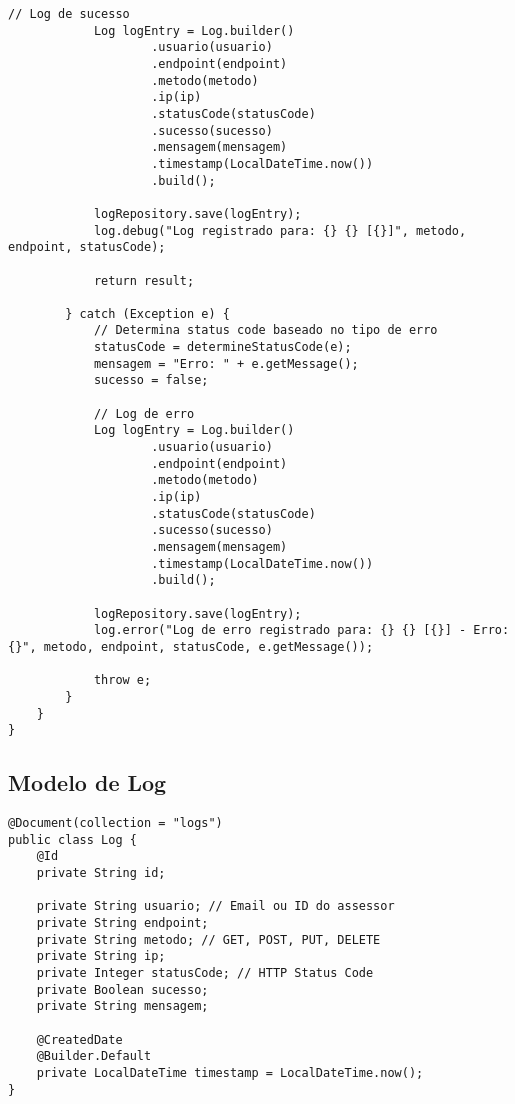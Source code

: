 \documentclass[12pt,a4paper]{article}
\begin{document}
\begin{lstlisting}[caption=LoggingAspect - Logging Automático]
            // Log de sucesso
            Log logEntry = Log.builder()
                    .usuario(usuario)
                    .endpoint(endpoint)
                    .metodo(metodo)
                    .ip(ip)
                    .statusCode(statusCode)
                    .sucesso(sucesso)
                    .mensagem(mensagem)
                    .timestamp(LocalDateTime.now())
                    .build();
            
            logRepository.save(logEntry);
            log.debug("Log registrado para: {} {} [{}]", metodo, endpoint, statusCode);
            
            return result;
            
        } catch (Exception e) {
            // Determina status code baseado no tipo de erro
            statusCode = determineStatusCode(e);
            mensagem = "Erro: " + e.getMessage();
            sucesso = false;
            
            // Log de erro
            Log logEntry = Log.builder()
                    .usuario(usuario)
                    .endpoint(endpoint)
                    .metodo(metodo)
                    .ip(ip)
                    .statusCode(statusCode)
                    .sucesso(sucesso)
                    .mensagem(mensagem)
                    .timestamp(LocalDateTime.now())
                    .build();
            
            logRepository.save(logEntry);
            log.error("Log de erro registrado para: {} {} [{}] - Erro: {}", metodo, endpoint, statusCode, e.getMessage());
            
            throw e;
        }
    }
}
\end{lstlisting}

\subsection{Modelo de Log}

\begin{lstlisting}[caption=Modelo Log]
@Document(collection = "logs")
public class Log {
    @Id
    private String id;
    
    private String usuario; // Email ou ID do assessor
    private String endpoint;
    private String metodo; // GET, POST, PUT, DELETE
    private String ip;
    private Integer statusCode; // HTTP Status Code
    private Boolean sucesso;
    private String mensagem;
    
    @CreatedDate
    @Builder.Default
    private LocalDateTime timestamp = LocalDateTime.now();
}
\end{lstlisting}
\end{document}
